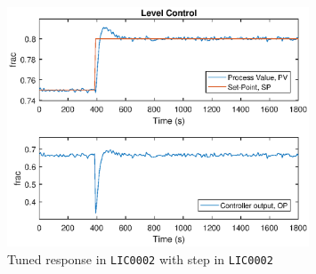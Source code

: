 \documentclass[a4paper]{scrartcl}
\begin{document}
\begin{figure}[ht!]
	\centering
	\includegraphics[width=0.8\textwidth]{fig/tuned/LIC0002_step2_tuned.eps}
	\caption{Tuned response in \texttt{LIC0002} with step in \texttt{LIC0002}}
	\label{fig:5b4}
\end{figure}
\end{document}
